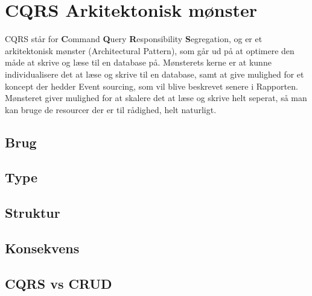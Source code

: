 \chapter{CQRS Arkitektonisk mønster}

CQRS står for \textbf{C}ommand \textbf{Q}uery \textbf{R}esponsibility \textbf{S}egregation, og er et arkitektonisk mønster (Architectural Pattern), som går ud på at optimere den måde at skrive og læse til en database på. Mønsterets kerne er at kunne individualisere det at læse og skrive til en database, samt at give mulighed for et koncept der hedder Event sourcing, som vil blive beskrevet senere i Rapporten. Mønsteret giver mulighed for at skalere det at læse og skrive helt seperat, så man kan bruge de resourcer der er til rådighed, helt naturligt.

\section{Brug}

\section{Type}

\section{Struktur}

\section{Konsekvens}

\section{CQRS vs CRUD}

